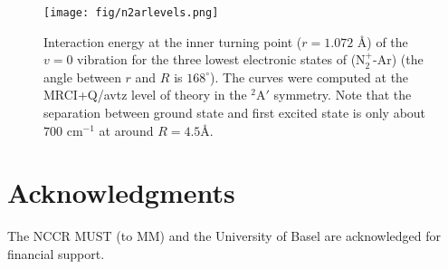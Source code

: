 \documentclass[journal=jacsat,manuscript=article]{achemso}
\begin{document}
\begin{figure}
\texttt{[image: fig/n2arlevels.png]}
\caption{Interaction energy at the inner turning point ($r = 1.072$
  \AA\/) of the $v = 0$ vibration for the three lowest electronic
  states of (N$_2^+$-Ar) (the angle between $r$ and $R$ is
  $168^{\circ}$). The curves were computed at the MRCI+Q/avtz level of
  theory in the $^2$A$'$ symmetry. Note that the separation between
  ground state and first excited state is only about $700$ cm$^{-1}$
  at around $R=4.5$\AA\/.}
\label{fig:n2arlevels}
\end{figure}
    
\section*{Acknowledgments}
The NCCR MUST (to MM) and the University of Basel are acknowledged for
financial support.



\end{document}
